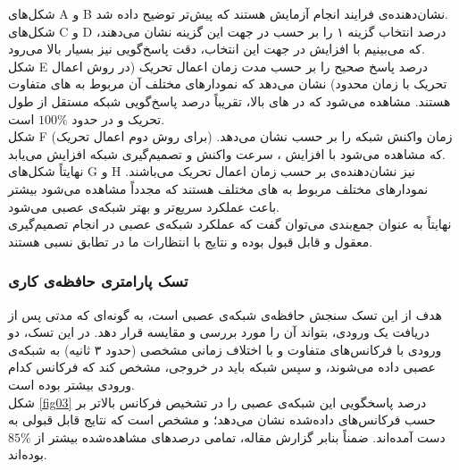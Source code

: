 \documentclass[a4paper]{article}
\begin{document}
شکل‌های A و B نشان‌دهنده‌ی فرایند انجام آزمایش هستند که پیش‌تر توضیح داده شد.\\

شکل‌های C و D درصد انتخاب گزینه ۱ را بر حسب  در جهت این گزینه نشان می‌دهند، که می‌بینیم با افزایش 
 در جهت این انتخاب، دقت پاسخ‌گویی نیز بسیار بالا می‌رود.\\
 
 شکل E درصد پاسخ صحیح را بر حسب مدت زمان اعمال تحریک (در روش اعمال تحریک با زمان محدود) نشان می‌دهد که نمودارهای مختلف آن مربوط به های متفاوت هستند. مشاهده می‌شود که در های بالا، تقریباً درصد پاسخ‌گویی شبکه مستقل از طول تحریک و در حدود $100\%$ است.\\
 
 شکل F زمان واکنش شبکه را بر حسب  نشان می‌دهد. (برای روش دوم اعمال تحریک) که مشاهده می‌شود با افزایش ، سرعت واکنش و تصمیم‌گیری شبکه افزایش می‌یابد.\\
 
 نهایتاً شکل‌های G و H نیز نشان‌دهنده‌ی 
بر حسب زمان اعمال تحریک می‌باشند. نمودارهای مختلف مربوط به های مختلف هستند که مجدداً مشاهده می‌شود  بیشتر باعث عملکرد سریع‌تر و بهتر شبکه‌ی عصبی می‌شود.\\

نهایتاً به عنوان جمع‌بندی می‌توان گفت که عملکرد شبکه‌ی عصبی در انجام تصمیم‌گیری معقول و قابل قبول بوده و نتایج با انتظارات ما در تطابق نسبی هستند.


\subsubsection{تسک پارامتری حافظه‌ی کاری 
}
هدف از این تسک سنجش حافظه‌ی شبکه‌ی عصبی است، به گونه‌ای که مدتی پس از دریافت یک ورودی، بتواند آن را مورد بررسی و مقایسه قرار دهد. در این تسک، دو ورودی با فرکانس‌های متفاوت و با اختلاف زمانی مشخصی (حدود ۳ ثانیه) به شبکه‌ی عصبی داده می‌شوند، و سپس شبکه باید در خروجی، مشخص کند که فرکانس کدام ورودی بیشتر بوده است.\\

شکل \ref{fig03} درصد پاسخگویی این شبکه‌ی عصبی را در تشخیص فرکانس بالاتر بر حسب فرکانس‌های داده‌شده نشان می‌دهد؛ و مشخص است که نتایج قابل قبولی به دست آمده‌اند. ضمناً بنابر گزارش مقاله، تمامی درصدهای مشاهده‌شده بیشتر از $85\%$ بوده‌اند.
\end{document}
